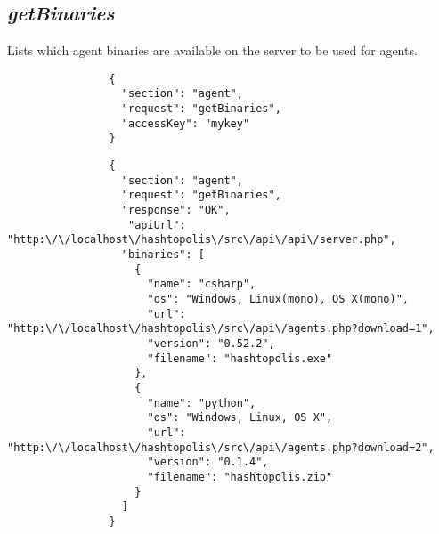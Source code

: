 \documentclass{article}
\begin{document}
		\subsection*{\textit{getBinaries}}
			Lists which agent binaries are available on the server to be used for agents.
			{
				\color{blue}
				\begin{verbatim}
				{
				  "section": "agent",
				  "request": "getBinaries",
				  "accessKey": "mykey"
				}
				\end{verbatim}
			}
			{
				\color{OliveGreen}
				\begin{verbatim}
				{
				  "section": "agent",
				  "request": "getBinaries",
				  "response": "OK",
				   "apiUrl": "http:\/\/localhost\/hashtopolis\/src\/api\/api\/server.php",
				  "binaries": [
				    {
				      "name": "csharp",
				      "os": "Windows, Linux(mono), OS X(mono)",
				      "url": "http:\/\/localhost\/hashtopolis\/src\/api\/agents.php?download=1",
				      "version": "0.52.2",
				      "filename": "hashtopolis.exe"
				    },
				    {
				      "name": "python",
				      "os": "Windows, Linux, OS X",
				      "url": "http:\/\/localhost\/hashtopolis\/src\/api\/agents.php?download=2",
				      "version": "0.1.4",
				      "filename": "hashtopolis.zip"
				    }
				  ]
				}
				\end{verbatim}
			}
\end{document}
